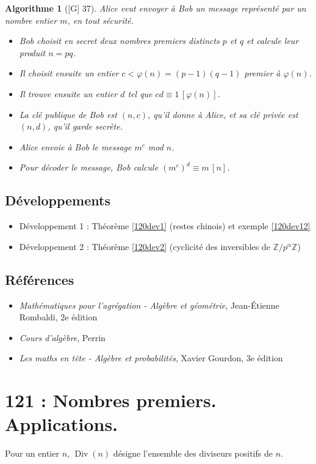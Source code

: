 \documentclass[10pt, a4paper, parskip=full, twoside, twocolumn]{report}
\newtheorem{algorithm}[definition]{Algorithme}
\newcommand{\IZ}{\mathbb{Z}}
\DeclareMathOperator{\Div}{Div}
\begin{document}
\begin{algorithm}[\textnormal{[G] 37}]
	Alice veut envoyer à Bob un message représenté par un nombre 
entier $m$, en tout sécurité.
\begin{itemize}
	\item Bob choisit en secret deux nombres premiers distincts $p$ et $q$ et calcule leur produit $n=pq$.
	\item Il choisit ensuite un entier $c<\varphi(n)=(p-1)(q-1)$ premier à $\varphi(n)$.
	\item Il trouve ensuite un entier $d$ tel que $cd \equiv 1\,[\varphi(n)]$.
	\item La clé publique de Bob est $(n,c)$, qu'il donne à Alice, et sa clé privée est $(n,d)$, qu'il garde secrète.
	\item Alice envoie à Bob le message $m^c$ mod $n$.
	\item Pour décoder le message, Bob calcule $\left(m^c\right)^d\equiv m\,[n]$.
\end{itemize}
\end{algorithm}

\section*{Développements}
\begin{itemize}
	\item Développement 1 : Théorème \ref{120dev1} (restes chinois) et exemple \ref{120dev12}
	\item Développement 2 : Théorème \ref{120dev2} (cyclicité des inversibles de $\IZ/p^{\alpha}\IZ$)
\end{itemize}

\section*{Références}
\begin{itemize}
	\item[Rb] \emph{Mathématiques pour l'agrégation - Algèbre et géométrie}, Jean-Étienne Rombaldi, 2e édition
	\item[P] \emph{Cours d'algèbre}, Perrin
	\item[G] \emph{Les maths en tête - Algèbre et probabilités}, Xavier Gourdon, 3e édition
\end{itemize}

\chapter*{121 : Nombres premiers. Applications.}
\setcounter{definition}{0}
Pour un entier $n$, $\Div(n)$ désigne l'ensemble des diviseurs positifs de $n$.	
\end{document}
